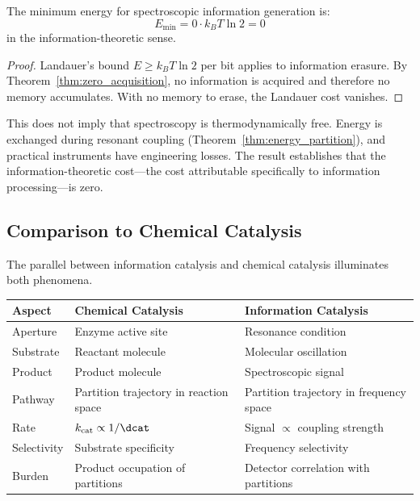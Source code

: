 \begin{corollary}
\label{cor:zero_landauer}
The minimum energy for spectroscopic information generation is:
\begin{equation}
E_{\mathrm{min}} = 0 \cdot k_B T \ln 2 = 0
\end{equation}
in the information-theoretic sense.
\end{corollary}

\begin{proof}
Landauer's bound $E \geq k_B T \ln 2$ per bit applies to information erasure. By Theorem~\ref{thm:zero_acquisition}, no information is acquired and therefore no memory accumulates. With no memory to erase, the Landauer cost vanishes.
\end{proof}

This does not imply that spectroscopy is thermodynamically free. Energy is exchanged during resonant coupling (Theorem~\ref{thm:energy_partition}), and practical instruments have engineering losses. The result establishes that the information-theoretic cost—the cost attributable specifically to information processing—is zero.

\subsection{Comparison to Chemical Catalysis}

The parallel between information catalysis and chemical catalysis illuminates both phenomena.

\begin{center}
\begin{tabular}{lll}
\toprule
\textbf{Aspect} & \textbf{Chemical Catalysis} & \textbf{Information Catalysis} \\
\midrule
Aperture & Enzyme active site & Resonance condition \\
Substrate & Reactant molecule & Molecular oscillation \\
Product & Product molecule & Spectroscopic signal \\
Pathway & Partition trajectory in reaction space & Partition trajectory in frequency space \\
Rate & $k_{\mathrm{cat}} \propto 1/\dcat$ & Signal $\propto$ coupling strength \\
Selectivity & Substrate specificity & Frequency selectivity \\
Burden & Product occupation of partitions & Detector correlation with partitions \\
\bottomrule
\end{tabular}
\end{center}

